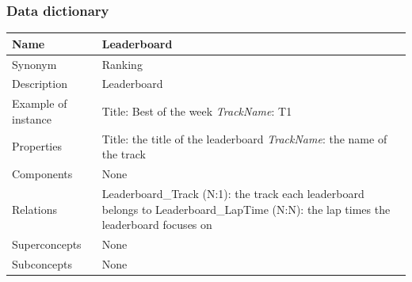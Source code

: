 \documentclass{beamer}
\begin{document}
\begin{frame}
\frametitle{Data dictionary}
\begin{table}
\tiny
\begin{tabular}{|p{2cm}|p{6cm}|}
\hline
Name & \textbf{Leaderboard} \\
\hline
Synonym & Ranking \\
\hline
Description & Leaderboard \\
\hline
Example of instance &
Title: Best of the week \newline
\textit{TrackName}: T1 \\
\hline
Properties &
Title: the title of the leaderboard \newline
\textit{TrackName}: the name of the track \\
\hline
Components & None \\
\hline
Relations &
Leaderboard\_Track (N:1): the track each leaderboard belongs to \newline
Leaderboard\_LapTime (N:N): the lap times the leaderboard focuses on \\
\hline
Superconcepts & None \\
\hline
Subconcepts & None \\
\hline
\end{tabular}
\end{table}
\end{frame}
\end{document}
